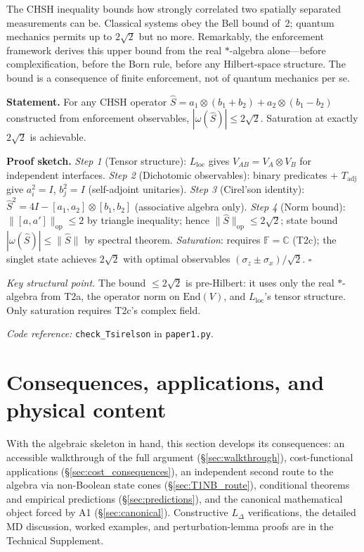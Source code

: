 \documentclass[11pt]{article}
\theoremstyle{remark}
\newcommand{\coderef}[2]{\smallskip\noindent\textit{Code reference:} \texttt{#1} in \texttt{#2}.}
\begin{document}
\noindent The CHSH inequality bounds how strongly correlated two spatially separated measurements can be.  Classical systems obey the Bell bound of~2; quantum mechanics permits up to $2\sqrt{2}$ but no more.  Remarkably, the enforcement framework derives this upper bound from the real $*$-algebra alone---before complexification, before the Born rule, before any Hilbert-space structure.  The bound is a consequence of finite enforcement, not of quantum mechanics per se.

\begin{tcolorbox}[apfbox, title={$T_{\mathrm{Tsirelson}}$: Tsirelson Bound $\le 2\sqrt{2}$}]
\textbf{Statement.}  For any CHSH operator $\hat{S} = a_1 \otimes (b_1 + b_2) + a_2 \otimes (b_1 - b_2)$ constructed from enforcement observables, $|\omega(\hat{S})| \le 2\sqrt{2}$.  Saturation at exactly $2\sqrt{2}$ is achievable.

\smallskip\noindent\textbf{Proof sketch.}  \textit{Step 1} (Tensor structure): $L_{\mathrm{loc}}$ gives $V_{AB} = V_A \otimes V_B$ for independent interfaces.  \textit{Step 2} (Dichotomic observables): binary predicates + $T_{\mathrm{adj}}$ give $a_i^2 = I$, $b_j^2 = I$ (self-adjoint unitaries).  \textit{Step 3} (Cirel'son identity): $\hat{S}^2 = 4I - [a_1,a_2] \otimes [b_1,b_2]$ (associative algebra only).  \textit{Step 4} (Norm bound): $\|[a,a']\|_{\mathrm{op}} \le 2$ by triangle inequality; hence $\|\hat{S}\|_{\mathrm{op}} \le 2\sqrt{2}$; state bound $|\omega(\hat{S})| \le \|\hat{S}\|$ by spectral theorem.  \textit{Saturation}: requires $\mathbb{F} = \mathbb{C}$ (T2c); the singlet state achieves $2\sqrt{2}$ with optimal observables $(\sigma_z \pm \sigma_x)/\sqrt{2}$.  \hfill$\square$

\smallskip\noindent\textit{Key structural point.}  The bound $\le 2\sqrt{2}$ is pre-Hilbert: it uses only the real $*$-algebra from T2a, the operator norm on $\mathrm{End}(V)$, and $L_{\mathrm{loc}}$'s tensor structure.  Only saturation requires T2c's complex field.

\coderef{check\_Tsirelson}{paper1.py}
\end{tcolorbox}

\section{Consequences, applications, and physical content}
\label{sec:consequences}

\noindent With the algebraic skeleton in hand, this section develops its consequences: an accessible walkthrough of the full argument (\S\ref{sec:walkthrough}), cost-functional applications (\S\ref{sec:cost_consequences}), an independent second route to the algebra via non-Boolean state cones (\S\ref{sec:T1NB_route}), conditional theorems and empirical predictions (\S\ref{sec:predictions}), and the canonical mathematical object forced by A1 (\S\ref{sec:canonical}).  Constructive $L_\Delta$ verifications, the detailed MD discussion, worked examples, and perturbation-lemma proofs are in the Technical Supplement.
\end{document}
